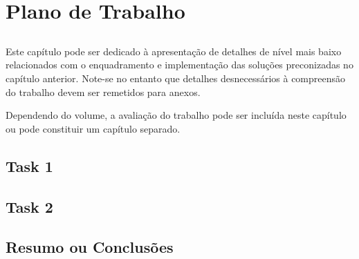 
\chapter{Plano de Trabalho}\label{chap:chap4}

\section*{}

Este capítulo pode ser dedicado à apresentação de detalhes de nível
mais baixo relacionados com o enquadramento e implementação das
soluções preconizadas no capítulo anterior.
Note-se no entanto que detalhes desnecessários à compreensão do
trabalho devem ser remetidos para anexos.

Dependendo do volume, a avaliação do trabalho pode ser incluída neste
capítulo ou pode constituir um capítulo separado.

\section{Task 1} %
\label{sec:task_1}
\lipsum

\section{Task 2} %
\label{sec:task_2}
\lipsum



\section{Resumo ou Conclusões}

\lipsum[1]

